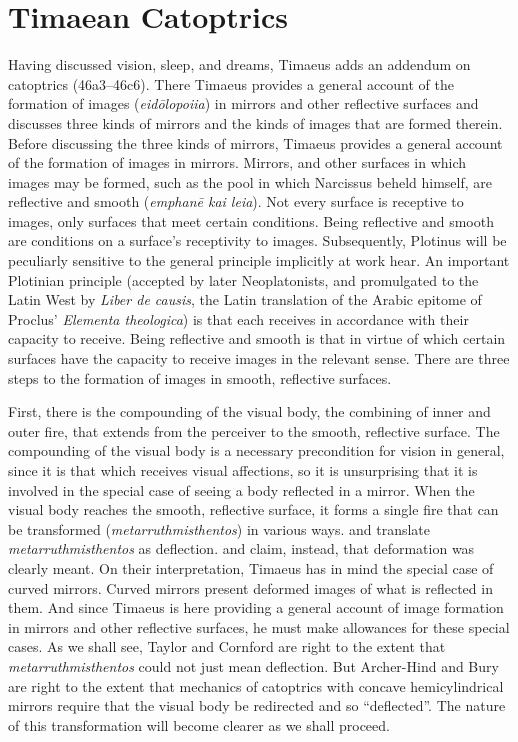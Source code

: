 
\section{Timaean Catoptrics} %
\label{sec:timaen_catoptrics}

Having discussed vision, sleep, and dreams, Timaeus adds an addendum on catoptrics (46a3–46c6). There Timaeus provides a general account of the formation of images (\emph{eidōlopoiia}) in mirrors and other reflective surfaces and discusses three kinds of mirrors and the kinds of images that are formed therein. Before discussing the three kinds of mirrors, Timaeus provides a general account of the formation of images in mirrors. Mirrors, and other surfaces in which images may be formed, such as the pool in which Narcissus beheld himself, are reflective and smooth (\emph{emphanē kai leia}). Not every surface is receptive to images, only surfaces that meet certain conditions. Being reflective and smooth are conditions on a surface's receptivity to images. Subsequently, Plotinus will be peculiarly sensitive to the general principle implicitly at work hear. An important Plotinian principle (accepted by later Neoplatonists, and promulgated to the Latin West by \emph{Liber de causis}, the Latin translation of the Arabic epitome of Proclus' \emph{Elementa theologica}) is that each receives in accordance with their capacity to receive. Being reflective and smooth is that in virtue of which certain surfaces have the capacity to receive images in the relevant sense. There are three steps to the formation of images in smooth, reflective surfaces. 


First, there is the compounding of the visual body, the combining of inner and outer fire, that extends from the perceiver to the smooth, reflective surface. The compounding of the visual body is a necessary precondition for vision in general, since it is that which receives visual affections, so it is unsurprising that it is involved in the special case of seeing a body reflected in a mirror. When the visual body reaches the smooth, reflective surface, it forms a single fire that can be transformed (\emph{metarruthmisthentos}) in various ways. \citet[159]{Archer-Hind:1888qd} and \citet[103]{Bury:1929jb} translate \emph{metarruthmisthentos} as deflection. \citet[287]{Taylor:1928qb} and \citet[154]{Cornford:1935fk} claim, instead, that deformation was clearly meant. On their interpretation, Timaeus has in mind the special case of curved mirrors. Curved mirrors present deformed images of what is reflected in them. And since Timaeus is here providing a general account of image formation in mirrors and other reflective surfaces, he must make allowances for these special cases. As we shall see, Taylor and Cornford are right to the extent that \emph{metarruthmisthentos} could not just mean deflection. But Archer-Hind and Bury are right to the extent that mechanics of catoptrics with concave hemicylindrical mirrors require that the visual body be redirected and so ``deflected''. The nature of this transformation will become clearer as we shall proceed.

